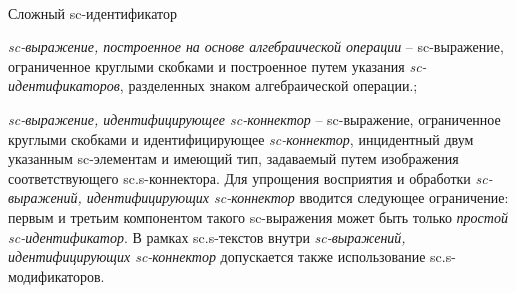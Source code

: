 \begin{frame}{\\Сложный sc-идентификатор}
	\topline
	\justifying
	\vspace*{\fill}\\
	\scriptsize{
		\begin{textitemize}
			\item{\textit{sc-выражение, построенное на основе алгебраической операции} -- sc-выражение, ограниченное круглыми скобками и построенное путем указания \textit{sc-идентификаторов}, разделенных знаком алгебраической операции.};
			\item{\textit{sc-выражение, идентифицирующее sc-коннектор} -- sc-выражение, ограниченное круглыми скобками и идентифицирующее \textit{sc-коннектор}, инцидентный двум указанным sc-элементам и имеющий тип, задаваемый путем изображения соответствующего sc.s-коннектора.
				Для упрощения восприятия и обработки \textit{sc-выражений, идентифицирующих sc-коннектор} вводится следующее ограничение: первым и третьим компонентом такого sc-выражения может быть только \textit{простой sc-идентификатор}. В рамках sc.s-текстов внутри \textit{sc-выражений, идентифицирующих sc-коннектор} допускается также использование sc.s-модификаторов.}	
		\end{textitemize}	
	}
\end{frame}